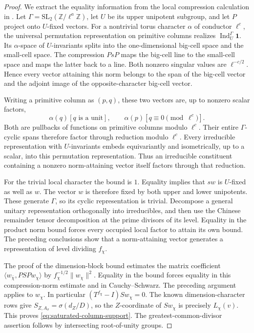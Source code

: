 \begin{proof}
We extract the equality information from the local compression
calculation in \cite[Lemma~4.1]{SchDimensionBlock}. Let
$\Gamma=\mathrm{SL}_2(\mathbb Z/\ell^a\mathbb Z)$, let $U$ be its
upper unipotent subgroup, and let $P$ project onto $U$-fixed vectors.
For a nontrivial torus character $\alpha$ of conductor $\ell^c$, the
universal permutation representation on primitive columns realizes
$\operatorname{Ind}_U^\Gamma\mathbf1$. Its $\alpha$-space of
$U$-invariants splits into the one-dimensional big-cell space and
the small-cell space. The compression $PsP$ maps the big-cell line
to the small-cell space and maps the latter back to a line. Both
nonzero singular values are $\ell^{-c/2}$. Hence every vector
attaining this norm belongs to the span of the big-cell vector and
the adjoint image of the opposite-character big-cell vector.

Writing a primitive column as $(p,q)$, these two vectors are, up to
nonzero scalar factors,
\[
 \alpha(q)[q\text{ is a unit}],\qquad
 \alpha(p)[q\equiv0\pmod{\ell^c}].
\]
Both are pullbacks of functions on primitive columns modulo $\ell^c$.
Their entire $\Gamma$-cyclic spans therefore factor through reduction
modulo $\ell^c$. Every irreducible representation with $U$-invariants
embeds equivariantly and isometrically, up to a scalar, into this
permutation representation. Thus an irreducible constituent containing
a nonzero norm-attaining vector itself factors through that reduction.

For the trivial local character the bound is $1$. Equality implies
that $sw$ is $U$-fixed as well as $w$. The vector $w$ is therefore fixed
by both upper and lower unipotents. These generate $\Gamma$, so its
cyclic representation is trivial. Decompose a general unitary
representation orthogonally into irreducibles, and then use the Chinese
remainder tensor decomposition at the prime divisors of its level.
Equality in the product norm bound forces every occupied local factor
to attain its own bound. The preceding conclusions show that a
norm-attaining vector generates a representation of level dividing
$f_\chi$.

The proof of the dimension-block bound estimates the matrix coefficient
$\langle w_{\bar\chi},PSPw_\chi\rangle$ by
$f_\chi^{-1/2}\|w_\chi\|^2$. Equality in the bound forces equality
in this compression-norm estimate and in Cauchy--Schwarz. The preceding
argument applies to $w_\chi$. In particular
$(T^{f_\chi}-I)Sw_\chi=0$. The known dimension-character rows give
$S_{Z,A_\sigma}=\sigma(d_Z/D)$, so the $Z$-coordinate of $Sw_\chi$
is precisely $L_\chi(v)$. This proves
\eqref{eq:saturated-column-support}. The greatest-common-divisor
assertion follows by intersecting root-of-unity groups.
\end{proof}

